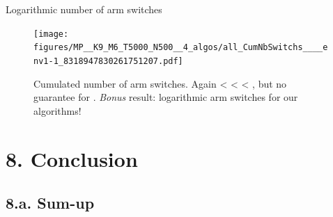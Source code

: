 \documentclass[12pt,english,ignorenonframetext,aspectratio=169,]{beamer}
\begin{document}
\begin{frame}[plain]{Logarithmic number of arm switches}

\begin{figure}[h!]
\centering
\texttt{[image: figures/MP\_\_K9\_M6\_T5000\_N500\_\_4\_algos/all\_CumNbSwitchs\_\_\_\_env1-1\_8318947830261751207.pdf]}
\caption{\footnotesize{Cumulated number of arm switches. Again \textcolor{blue}{\rhoRand{}} < \textcolor{red}{\RandTopM{}} < \textcolor{bluegreen}{\Selfish{}} < \textcolor{yellowgreen}{\MCTopM{}}, but no guarantee for \textcolor{blue}{\rhoRand{}}. \emph{Bonus} result: logarithmic arm switches for our algorithms!}}
\end{figure}

\end{frame}







\section{\hfill{}8. Conclusion\hfill{}}\subsection{\hfill{}8.a. Sum-up\hfill{}}
\end{document}
